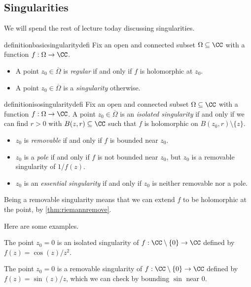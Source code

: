 \subsection{Singularities}
We will spend the rest of lecture today discussing singularities.
\begin{restatable}{definition}{basicsingularitydefi}
	Fix an open and connected subset $\Omega\subseteq\CC$ with a function $f:\Omega\to\CC$.
	\begin{itemize}
		\item A point $z_0\in\overline\Omega$ is \textit{regular} if and only if $f$ is holomorphic at $z_0$.
		\item A point $z_0\in\overline\Omega$ is a \textit{singularity} otherwise.
	\end{itemize}
\end{restatable}
\begin{restatable}{definition}{isosingularitydefi}   
	Fix an open and connected subset $\Omega\subseteq\CC$ with a function $f:\Omega\to\CC$. A point $z_0\in\overline\Omega$ is an \textit{isolated singularity} if and only if we can find $r>0$ with $B(z,r)\subseteq\CC$ such that $f$ is holomorphic on $B(z_0,r)\setminus\{z\}$.
	\begin{itemize}
		\item $z_0$ is \textit{removable} if and only if $f$ is bounded near $z_0$.
		\item $z_0$ is a \textit{pole} if and only if $f$ is not bounded near $z_0$, but $z_0$ is a removable singularity of $1/f(z)$.
		\item $z_0$ is an \textit{essential singularity} if and only if $z_0$ is neither removable nor a pole.
	\end{itemize}
\end{restatable}
\begin{remark}
	Being a removable singularity means that we can extend $f$ to be holomorphic at the point, by \autoref{thm:riemannremove}.
\end{remark}
Here are some examples.
\begin{example}
	The point $z_0=0$ is an isolated singularity of $f:\CC\setminus\{0\}\to\CC$ defined by $f(z)=\cos(z)/z^2$.
\end{example}
\begin{example}
	The point $z_0=0$ is a removable singularity of $f:\CC\setminus\{0\}\to\CC$ defined by $f(z)=\sin(z)/z$, which we can check by bounding $\sin$ near $0$.
\end{example}
